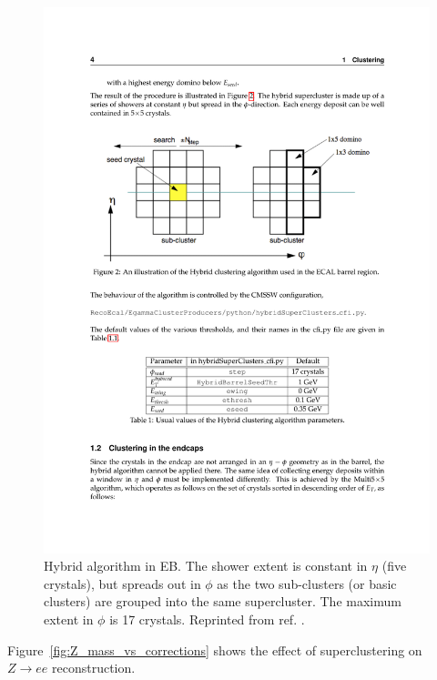 \documentclass[dissertation.tex]{subfiles}
\begin{document}
\begin{figure}
	\centering
	\includegraphics[scale=1.0]{hybrid}
	\caption{Hybrid algorithm in EB.  The shower extent is constant in $\eta$ (five crystals), but spreads out in $\phi$ as the two sub-clusters (or basic clusters) are grouped into the same supercluster.  The maximum extent in $\phi$ is 17 crystals.  Reprinted from ref. \cite{ECAL_SC_note}.}
	\label{fig:hybrid}
\end{figure}

Figure~\ref{fig:Z_mass_vs_corrections} shows the effect of superclustering on $Z\rightarrow ee$ reconstruction.
\end{document}

